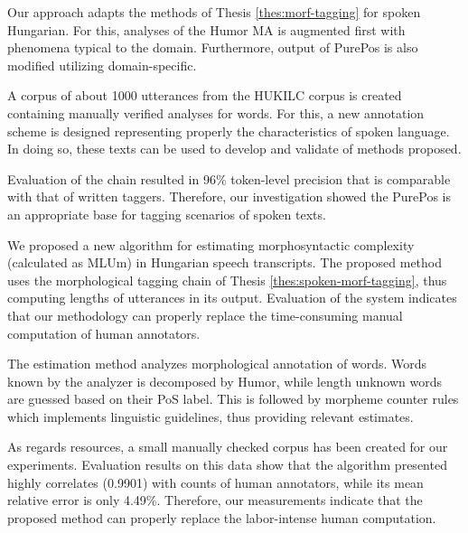Our approach adapts the methods of Thesis \ref{thes:morf-tagging} for spoken Hungarian.
For this, analyses of the Humor MA is augmented first with phenomena typical to the domain.
Furthermore, output of PurePos is also modified utilizing domain-specific.

A corpus of about 1000 utterances from the HUKILC corpus is created containing manually verified analyses for words. 
For this, a new annotation scheme is designed representing properly the characteristics of spoken language.
In doing so, these texts can be used to develop and validate of methods proposed.

Evaluation of the chain resulted in 96\% token-level precision that is comparable with that of written taggers.
Therefore, our investigation showed the PurePos is an appropriate base for tagging scenarios of spoken texts.

\thesisline%


\begin{core}
\begin{thesis}
\label{thes:mlu-estimation}
We proposed a new algorithm for estimating morphosyntactic complexity (calculated as MLUm) in Hungarian speech transcripts.
The proposed method uses the morphological tagging chain of Thesis \ref{thes:spoken-morf-tagging}, thus computing lengths of utterances in its output.
Evaluation of the system indicates that our methodology can properly replace the time-consuming manual computation of human annotators.
\end{thesis}

\begin{pub}
\cite{Matyus2014,Orosz2014c}
\end{pub}
\end{core}

The estimation method analyzes morphological annotation of words.
Words known by the analyzer is decomposed by Humor, while length unknown words are guessed based on their PoS label.
This is followed by morpheme counter rules which implements linguistic guidelines, thus providing relevant estimates.

As regards resources, a small manually checked corpus has been created for our experiments.
Evaluation results on this data show that the algorithm presented highly correlates (0.9901) with counts of human annotators, while its mean relative error is only 4.49\%.
Therefore, our measurements indicate that the proposed method can properly replace the labor-intense human computation.

